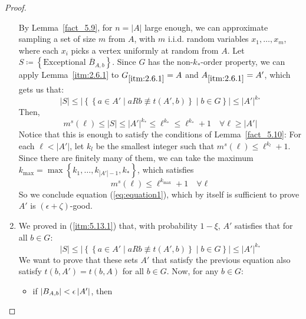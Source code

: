 \begin{proof}
\begin{enumerate}[label=(\alph*), ref=\alph*]
                By Lemma~\ref{fact_5.9}, for $n = |A|$ large enough, we can approximate sampling a set of size $m$ from $A$,
                with $m$ i.i.d. random variables $x_1, \dots, x_m$, where each $x_i$ picks a vertex uniformly at random from $A$.
                Let $S \coloneq \left\{ \text{Exceptional } \overline{B}_{A,b} \right\}$.
                Since $G$ has the non-$k_{*}$-order property, we can apply Lemma~\ref{itm:2.6.1} to $G_{\ref{itm:2.6.1}} = A$
                and $A_{\ref{itm:2.6.1}} = A'$, which gets us that:
                $$
                    |S| \leq \left|\left\{ \left\{ a \in A' \mid a R b \not\equiv t(A', b) \right\} \mid b \in G \right\} \right|
                    \leq |A'|^{k_*}
                $$
                Then,
                $$
                    m^s(\ell) \leq \left| S \right| \leq |A'|^{k_*} \leq \ell^{k_*} \leq \ell^{k_{*}} + 1 \quad \forall \ell \geq |A'|
                $$
                Notice that this is enough to satisfy the conditions of Lemma~\ref{fact_5.10}:
                For each $\ell < |A'|$, let $k_l$ be the smallest integer such that $m^s(\ell) \leq \ell^{k_l} + 1$.
                Since there are finitely many of them, we can take the maximum
                $k_{\max} = \max \left\{ k_1, \dots, k_{|A'|-1}, k_* \right\}$, which satisfies
                $$
                    m^s(\ell) \leq \ell^{k_{\max}} + 1 \quad \forall \ell
                $$
                So we conclude equation (\ref{eq:equation1}), which by itself is sufficient to prove $A'$ is
                $(\epsilon + \zeta)$-good.
            \item We proved in (\ref{itm:5.13.1}) that, with probability $1 - \xi$, $A'$ satisfies that for all
                $b \in G$:
                $$
                    |S| \leq \left|\left\{ \left\{ a \in A' \mid a R b \not\equiv t(A', b) \right\} \mid b \in G \right\} \right|
                    \leq |A'|^{k_*}
                $$
                We want to prove that these sets $A'$ that satisfy the previous equation also satisfy $t(b,A') = t(b,A)$
                for all $b \in G$.
                Now, for any $b \in G$:
                \begin{itemize}
                    \item if $\left| B_{A,b} \right| < \epsilon \left| A' \right|$, then

\end{itemize}
\end{enumerate}
\end{proof}
